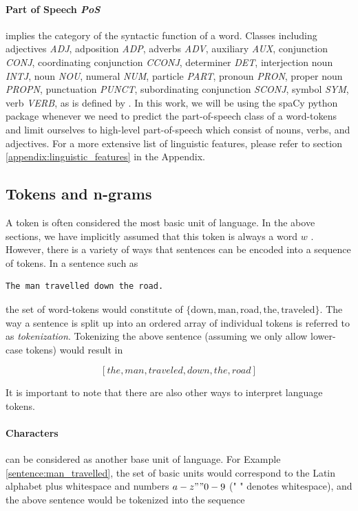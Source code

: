 \documentclass[a4paper,12pt,oneside,openright]{report}
\begin{document}
\paragraph{Part of Speech \textit{PoS}} implies the category of the syntactic function of a word.
Classes including adjectives \textit{ADJ}, adposition \textit{ADP}, adverbs \textit{ADV}, auxiliary \textit{AUX}, conjunction \textit{CONJ}, coordinating conjunction \textit{CCONJ}, determiner \textit{DET}, interjection noun \textit{INTJ}, noun \textit{NOU}, numeral \textit{NUM}, particle \textit{PART}, pronoun \textit{PRON}, proper noun \textit{PROPN}, punctuation \textit{PUNCT}, subordinating conjunction \textit{SCONJ}, symbol \textit{SYM}, verb \textit{VERB}, as is defined by \cite{spacyb}.
In this work, we will be using the spaCy python package  \cite{spacy} whenever we need to predict the part-of-speech class of a word-tokens and limit ourselves to high-level part-of-speech which consist of nouns, verbs, and adjectives.
For a more extensive list of linguistic features, please refer to section \ref{appendix:linguistic_features} in the Appendix.


\subsection{Tokens and n-grams}

A token is often considered the most basic unit of language.
In the above sections, we have implicitly assumed that this token is always a word $w$ . 
However, there is a variety of ways that sentences can be encoded into a sequence of tokens.
In a sentence such as

\begin{verbatim}
The man travelled down the road.
\end{verbatim}\label{sentence:man_travelled}

the set of word-tokens would constitute of $\{ \text{down}, \text{man}, \text{road}, \text{the}, \text{traveled} \}$.
The way a sentence is split up into an ordered array of individual tokens is referred to as \textit{tokenization}.
Tokenizing the above sentence (assuming we only allow lower-case tokens) would result in 

$$
[the, man, traveled, down, the, road]
$$

It is important to note that there are also other ways to interpret language tokens.

\paragraph{Characters} can be considered as another base unit of language.
For Example \ref{sentence:man_travelled}, the set of basic units would correspond to the Latin alphabet plus whitespace and numbers $a - z" "0-9$ (" " denotes whitespace), and the above sentence would be tokenized into the sequence 
\end{document}
